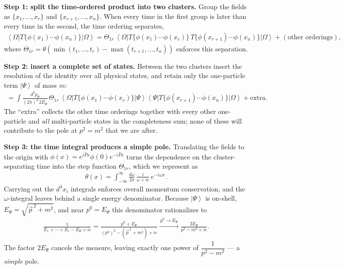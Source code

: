 \textbf{Step 1: split the time-ordered product into two clusters.} Group the fields as $\{x_1,\ldots,x_r\}$ and $\{x_{r+1},\ldots,x_n\}$. When every time in the first group is later than every time in the second, the time ordering separates,
\begin{align}
	\left\langle \Omega \right| T\{\phi(x_1)\cdots\phi(x_n)\} \left| \Omega \right\rangle
	= \Theta_{1r}\,
	\left\langle \Omega \right| T\{\phi(x_1)\cdots\phi(x_r)\}\, T\{\phi(x_{r+1})\cdots\phi(x_n)\} \left| \Omega \right\rangle
	+ (\text{other orderings}),
\end{align}
where $\Theta_{1r} = \theta\!\left(\min(t_1,\ldots,t_r) - \max(t_{r+1},\ldots,t_n)\right)$ enforces this separation.

\textbf{Step 2: insert a complete set of states.} Between the two clusters insert the resolution of the identity over all physical states, and retain only the one-particle term $\left| \Psi \right\rangle$ of mass $m$:
\begin{align}
	= \int \frac{d^3 p_\Psi}{(2\pi)^3\, 2 E_\Psi}\, \Theta_{1r}\,
	\left\langle \Omega \right| T\{\phi(x_1)\cdots\phi(x_r)\} \left| \Psi \right\rangle
	\left\langle \Psi \right| T\{\phi(x_{r+1})\cdots\phi(x_n)\} \left| \Omega \right\rangle
	+ \text{extra}.
\end{align}
The ``extra'' collects the other time orderings together with every other one-particle and \emph{all} multi-particle states in the completeness sum; none of these will contribute to the pole at $p^2 = m^2$ that we are after.

\textbf{Step 3: the time integral produces a simple pole.} Translating the fields to the origin with $\phi(x) = e^{i\hat P x}\phi(0) e^{-i\hat P x}$ turns the dependence on the cluster-separating time into the step function $\Theta_{1r}$, which we represent as
\begin{align}
	\theta(x) = \int_{-\infty}^{\infty} \frac{d\omega}{2\pi}\, \frac{i}{\omega + i\epsilon}\, e^{-i\omega x}.
\end{align}
Carrying out the $d^4 x_i$ integrals enforces overall momentum conservation, and the $\omega$-integral leaves behind a single energy denominator. Because $\left| \Psi \right\rangle$ is on-shell, $E_\Psi = \sqrt{\vec{p}^{\,2} + m^2}$, and near $p^0 = E_\Psi$ this denominator rationalizes to
\begin{align}
	\label{eq:polology-rationalize}
	\frac{1}{E_1 + \cdots + E_r - E_\Psi + i\epsilon}
	= \frac{p^0 + E_\Psi}{(p^0)^2 - (\vec{p}^{\,2} + m^2) + i\epsilon}
	\xrightarrow{\,p^0 \to E_\Psi\,}
	\frac{2 E_\Psi}{p^2 - m^2 + i\epsilon}.
\end{align}
The factor $2E_\Psi$ cancels the measure, leaving exactly one power of $\dfrac{1}{p^2 - m^2}$ --- a \emph{simple} pole.

